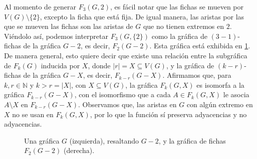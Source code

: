 Al momento de generar $F_3(G,{2})$, es f\'acil notar que las fichas se mueven por
$V(G) \setminus \{2\}$, excepto la ficha que est\'a fija. De igual manera, las
aristas por las que se mueven las fichas son las aristas de $G$ que no tienen
extremos en $2$. Vi\'endolo as\'i, podemos interpretar $F_3(G,\{2\})$ como la
gr\'afica de $(3-1)$-fichas de la gr\'afica $G-2$, es decir, $F_2(G-2)$. Esta
gr\'afica est\'a exhibida en \cref{fig:ex-tok-subgraph-aux}. De manera general,
esto quiere decir que existe una relaci\'on entre la subgr\'afica de $F_k(G)$
inducida por $X$, donde $|r|=X \subseteq V(G)$, y la gr\'afica de $(k-r)$-fichas
de la gr\'afica $G-X$, es decir, $F_{k-r}(G-X)$. Afirmamos que, para $k,r \in
\mathbb{N}$ y $k>r = |X|$, con $X \subseteq V(G)$, la gr\'afica $F_k(G,X)$ es
isomorfa a la gr\'afica $F_{k-r}(G-X)$, con el isomorfismo que a cada $A \in
F_k(G,X)$ le asocia $A \setminus X$ en $F_{k-r}(G-X)$.   Observamos que, las
aristas en $G$ con alg\'un extremo en $X$ no se usan en $F_k(G,X)$, por lo que
la funci\'on s\'i preserva adyacencias y no adyacencias.

\begin{figure}[ht!]
    \centering
    \caption{Una gr\'afica $G$ (izquierda), resaltando $G-2$, y la 
    gr\'afica de fichas $F_2(G-2)$ (derecha).}
    \label{fig:ex-tok-subgraph-aux}
\end{figure}

